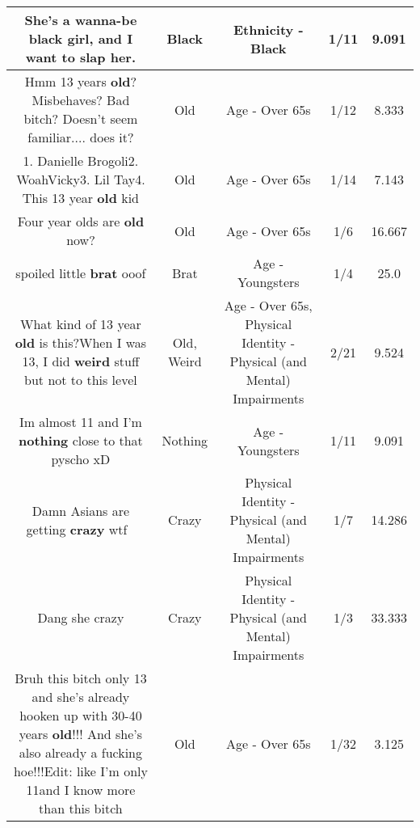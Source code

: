 \documentclass[11pt]{article}
\newlength\mylength
\begin{document}
\begin{center}
\begin{longtable}{|C{.65\mylength}|C{.30\mylength}|C{.12\mylength}|C{.12\mylength}|C{.12\mylength}|}
  \small She's a wanna-be \textbf{black} girl, and I want to slap her.\normalsize   & Black & Ethnicity - Black & 1/11 & 9.091 \\  \hline
  \small Hmm 13 years \textbf{old}? Misbehaves? Bad bitch? Doesn't seem familiar.... does it?\normalsize   & Old & Age - Over 65s & 1/12 & 8.333 \\  \hline
  \small 1. Danielle Brogoli2. WoahVicky3. Lil Tay4. This 13 year \textbf{old} kid\normalsize   & Old & Age - Over 65s & 1/14 & 7.143 \\  \hline
  \small Four year olds are \textbf{old} now?\normalsize   & Old & Age - Over 65s & 1/6 & 16.667 \\  \hline
  \small spoiled little \textbf{brat} ooof\normalsize   & Brat & Age - Youngsters & 1/4 & 25.0 \\  \hline
  \small What kind of 13 year \textbf{old} is this?When I was 13, I did \textbf{weird} stuff but not to this level\normalsize   & Old, Weird & Age - Over 65s, Physical Identity - Physical (and Mental) Impairments & 2/21 & 9.524 \\  \hline
  \small Im almost 11 and I'm \textbf{nothing} close to that pyscho xD\normalsize   & Nothing & Age - Youngsters & 1/11 & 9.091 \\  \hline
  \small Damn Asians are getting \textbf{crazy} wtf 🤯\normalsize   & Crazy & Physical Identity - Physical (and Mental) Impairments & 1/7 & 14.286 \\  \hline
  \small Dang she crazy\normalsize   & Crazy & Physical Identity - Physical (and Mental) Impairments & 1/3 & 33.333 \\  \hline
  \small Bruh this bitch only 13 and she's already hooken up with 30-40 years \textbf{old}!!! And she's also already a fucking hoe!!!Edit: like I'm only 11and I know more than this bitch\normalsize   & Old & Age - Over 65s & 1/32 & 3.125 \\  \hline

\end{longtable}
\end{center}
\end{document}
